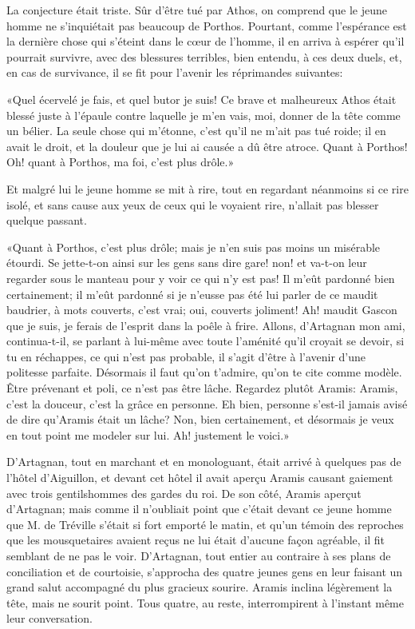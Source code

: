 La conjecture était triste. Sûr d'être tué par Athos, on comprend que le jeune homme ne s'inquiétait pas beaucoup de Porthos. Pourtant, comme l'espérance est la dernière chose qui s'éteint dans le cœur de l'homme, il en arriva à espérer qu'il pourrait survivre, avec des blessures terribles, bien entendu, à ces deux duels, et, en cas de survivance, il se fit pour l'avenir les réprimandes suivantes: 

«Quel écervelé je fais, et quel butor je suis! Ce brave et malheureux Athos était blessé juste à l'épaule contre laquelle je m'en vais, moi, donner de la tête comme un bélier. La seule chose qui m'étonne, c'est qu'il ne m'ait pas tué roide; il en avait le droit, et la douleur que je lui ai causée a dû être atroce. Quant à Porthos! Oh! quant à Porthos, ma foi, c'est plus drôle.» 

Et malgré lui le jeune homme se mit à rire, tout en regardant néanmoins si ce rire isolé, et sans cause aux yeux de ceux qui le voyaient rire, n'allait pas blesser quelque passant. 

«Quant à Porthos, c'est plus drôle; mais je n'en suis pas moins un misérable étourdi. Se jette-t-on ainsi sur les gens sans dire gare! non! et va-t-on leur regarder sous le manteau pour y voir ce qui n'y est pas! Il m'eût pardonné bien certainement; il m'eût pardonné si je n'eusse pas été lui parler de ce maudit baudrier, à mots couverts, c'est vrai; oui, couverts joliment! Ah! maudit Gascon que je suis, je ferais de l'esprit dans la poêle à frire. Allons, d'Artagnan mon ami, continua-t-il, se parlant à lui-même avec toute l'aménité qu'il croyait se devoir, si tu en réchappes, ce qui n'est pas probable, il s'agit d'être à l'avenir d'une politesse parfaite. Désormais il faut qu'on t'admire, qu'on te cite comme modèle. Être prévenant et poli, ce n'est pas être lâche. Regardez plutôt Aramis: Aramis, c'est la douceur, c'est la grâce en personne. Eh bien, personne s'est-il jamais avisé de dire qu'Aramis était un lâche? Non, bien certainement, et désormais je veux en tout point me modeler sur lui. Ah! justement le voici.» 

D'Artagnan, tout en marchant et en monologuant, était arrivé à quelques pas de l'hôtel d'Aiguillon, et devant cet hôtel il avait aperçu Aramis causant gaiement avec trois gentilshommes des gardes du roi. De son côté, Aramis aperçut d'Artagnan; mais comme il n'oubliait point que c'était devant ce jeune homme que M. de Tréville s'était si fort emporté le matin, et qu'un témoin des reproches que les mousquetaires avaient reçus ne lui était d'aucune façon agréable, il fit semblant de ne pas le voir. D'Artagnan, tout entier au contraire à ses plans de conciliation et de courtoisie, s'approcha des quatre jeunes gens en leur faisant un grand salut accompagné du plus gracieux sourire. Aramis inclina légèrement la tête, mais ne sourit point. Tous quatre, au reste, interrompirent à l'instant même leur conversation. 

